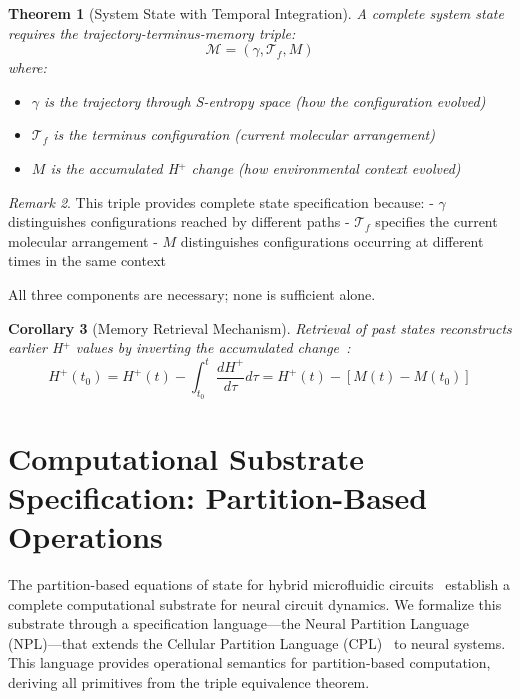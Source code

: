 \documentclass[aps,prd,twocolumn,superscriptaddress,floatfix,nofootinbib]{revtex4-2}
\newtheorem{theorem}{Theorem}[section]
\newtheorem{corollary}[theorem]{Corollary}
\theoremstyle{remark}
\newtheorem{remark}[theorem]{Remark}
\begin{document}
\begin{theorem}[System State with Temporal Integration]
\label{thm:mental_state_memory}
A complete system state requires the trajectory-terminus-memory triple:
\begin{equation}
\mathcal{M} = (\gamma, \mathcal{T}_f, M)
\end{equation}
where:
\begin{itemize}
\item $\gamma$ is the trajectory through S-entropy space (how the configuration evolved)
\item $\mathcal{T}_f$ is the terminus configuration (current molecular arrangement)
\item $M$ is the accumulated H$^+$ change (how environmental context evolved)
\end{itemize}
\end{theorem}

\begin{remark}
This triple provides complete state specification because:
- $\gamma$ distinguishes configurations reached by different paths
- $\mathcal{T}_f$ specifies the current molecular arrangement
- $M$ distinguishes configurations occurring at different times in the same context

All three components are necessary; none is sufficient alone.
\end{remark}

\begin{corollary}[Memory Retrieval Mechanism]
\label{cor:retrieval}
Retrieval of past states reconstructs earlier H$^+$ values by inverting the accumulated change~\cite{eichenbaum2000hippocampus}:
\begin{equation}
H^+(t_0) = H^+(t) - \int_{t_0}^{t} \frac{dH^+}{d\tau} d\tau = H^+(t) - [M(t) - M(t_0)]
\end{equation}
\end{corollary}

\section{Computational Substrate Specification: Partition-Based Operations}
\label{sec:language}

The partition-based equations of state for hybrid microfluidic circuits~\cite{sachikonye2024circuits,sachikonye2025partitionequations} establish a complete computational substrate for neural circuit dynamics. We formalize this substrate through a specification language—the Neural Partition Language (NPL)—that extends the Cellular Partition Language (CPL)~\cite{sachikonye2024cpl} to neural systems. This language provides operational semantics for partition-based computation, deriving all primitives from the triple equivalence theorem.
\end{document}
